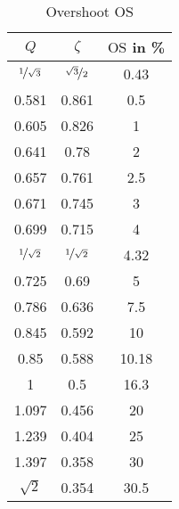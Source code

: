\documentclass{article}[11pt]
\begin{document}
\begin{table}[H]
\centering
\caption{Overshoot $\mathrm{OS}$}
\begin{tabular}{ccc}
\toprule
$Q$                      & $\zeta$                   & $\mathrm{OS}$ in \si{\percent}  \\ \midrule
$\nicefrac{1}{\sqrt{3}}$ & $\nicefrac{\sqrt{3}}{2}$  & 0.43                            \\ \midrule
0.581                    & 0.861                     & 0.5                             \\ \midrule
0.605                    & 0.826                     & 1                               \\ \midrule
0.641                    & 0.78                      & 2                               \\ \midrule
0.657                    & 0.761                     & 2.5                             \\ \midrule
0.671                    & 0.745                     & 3                               \\ \midrule
0.699                    & 0.715                     & 4                               \\ \midrule
$\nicefrac{1}{\sqrt{2}}$ & $\nicefrac{1}{\sqrt{2}}$  & 4.32                            \\ \midrule
0.725                    & 0.69                      & 5                               \\ \midrule
0.786                    & 0.636                     & 7.5                             \\ \midrule
0.845                    & 0.592                     & 10                              \\ \midrule
0.85                     & 0.588                     & 10.18                           \\ \midrule
1                        & 0.5                       & 16.3                            \\ \midrule
1.097                    & 0.456                     & 20                              \\ \midrule
1.239                    & 0.404                     & 25                              \\ \midrule
1.397                    & 0.358                     & 30                              \\ \midrule
$\sqrt{2}$               & 0.354                     & 30.5                            \\ \midrule

\end{tabular}
\end{table}
\end{document}
